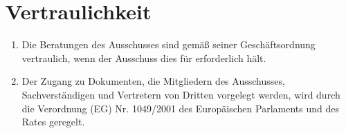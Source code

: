 \chapter{Vertraulichkeit}
\label{ch:76}


\begin{enumerate}

  \item Die Beratungen des Ausschusses sind gemäß seiner Geschäftsordnung vertraulich, wenn der Ausschuss dies für
   erforderlich hält.
  \label{itm:76-1}

  \item Der Zugang zu Dokumenten, die Mitgliedern des Ausschusses, Sachverständigen und Vertretern von Dritten vorgelegt
   werden, wird durch die Verordnung (EG) Nr. 1049/2001 des Europäischen Parlaments und des Rates
   geregelt.
  \label{itm:76-2}

\end{enumerate}   


